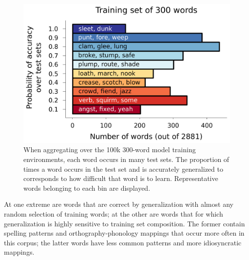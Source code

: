 \documentclass[10pt,letterpaper]{article}
\begin{document}
\begin{figure}[t]
	\includegraphics[width=0.9\columnwidth]{figures/word_accuracy_over_testsets.png}

	\caption{When aggregating over the 100k 300-word model training environments, each word occurs in many test sets. The proportion of times a word occurs in the test set and is accurately generalized to corresponds to how difficult that word is to learn. Representative words belonging to each bin are displayed.}
	\label{word_acc_hist}
\end{figure}

At one extreme are words that are correct by generalization with almost any random selection of training words; at the other are words that for which generalization is highly sensitive to training set composition. The former contain spelling patterns and orthography-phonology mappings that occur more often in this corpus; the latter words have less common patterns and more idiosyncratic mappings. 
\end{document}
